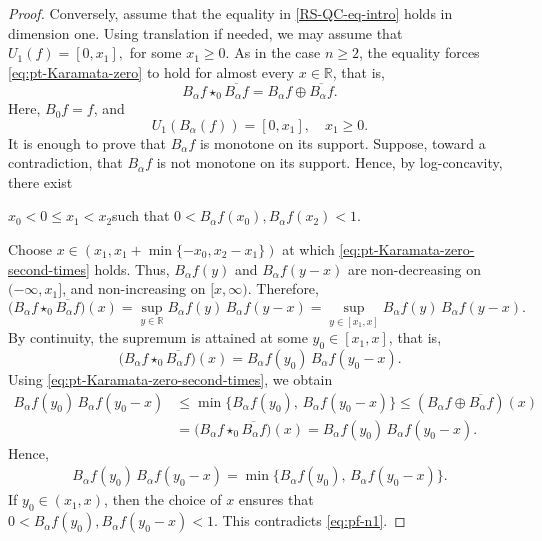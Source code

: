 \documentclass[11pt]{amsart}
\newcommand{\R}{{\mathbb R}}
\theoremstyle{plain}
\theoremstyle{definition}
\theoremstyle{remark}
\begin{document}
\begin{proof}
    Conversely, assume that the equality in \eqref{RS-QC-eq-intro} holds in dimension one. Using translation if needed, we may assume that
    $
        U_1 (f) = [0,x_1], $ for some $ x_1 \geq 0.
    $
    As in the case $n\geq 2$, the equality forces \eqref{eq:pt-Karamata-zero} to hold for almost every $x \in \R$, that is,
    \begin{equation}
        B_\alpha f \star_{0} \overline{B_\alpha f}  = B_\alpha f  \oplus \overline{B_\alpha f}. \label{eq:pt-Karamata-zero-second-times}
    \end{equation}
    Here, $B_0 f = f$, and
    \[
        U_1 (B_\alpha (f)) = [0,x_1], \quad x_1 \geq 0.
    \]
    It is enough to prove that $B_\alpha f$ is monotone on its support.
    Suppose, toward a contradiction, that $B_\alpha f$ is not monotone on its support. Hence, by log-concavity, there exist
    \begin{center}
        $x_0< 0 \leq x_1 <x_2$\quad  such that  \quad$0<B_\alpha f(x_0),B_\alpha f(x_2) < 1.$
    \end{center}
    Choose $x \in (x_1,x_1 + \min\{-x_0,x_2-x_1\})$ at which \eqref{eq:pt-Karamata-zero-second-times} holds. Thus,
    $B_\alpha f(y)$ and $B_\alpha f(y-x)$ are non-decreasing on $(-\infty,x_1]$, and non-increasing on $[x,\infty)$. Therefore,
    \[
        \bigl(B_\alpha f \star_0 \overline{B_\alpha f}\bigr)(x)
        =
        \sup_{y\in\R} B_\alpha f(y)\,B_\alpha f(y-x)
        =
        \sup_{y\in[x_1,x]} B_\alpha f(y)\,B_\alpha f(y-x).
    \]
    By continuity, the supremum is attained at some $y_0\in[x_1,x]$, that is,
    \[
        \bigl(B_\alpha f \star_0 \overline{B_\alpha f}\bigr)(x)
        =
        B_\alpha f(y_0)\,B_\alpha f(y_0-x).
    \]
    Using \eqref{eq:pt-Karamata-zero-second-times}, we obtain
    \begin{align}
        B_\alpha f(y_0)\,B_\alpha f(y_0-x) &\leq \min\{B_\alpha f(y_0),\,B_\alpha f(y_0-x)\} \leq (B_\alpha f  \oplus \overline{B_\alpha f}) (x)
        \\
        &=  \bigl(B_\alpha f \star_0 \overline{B_\alpha f}\bigr)(x) =B_\alpha f(y_0)\,B_\alpha f(y_0-x)
        .
    \end{align}
    Hence,
    \begin{align} \label{eq:pf-n1}
        B_\alpha f(y_0)\,B_\alpha f(y_0-x)
        =
        \min\{B_\alpha f(y_0),\,B_\alpha f(y_0-x)\}.
    \end{align}
    If $y_0 \in\left(x_1, x\right)$, then the choice of $x$ ensures that $0<B_\alpha f(y_0),B_\alpha f(y_0-x)<1$. This contradicts \eqref{eq:pf-n1}.

\end{proof}
\end{document}
